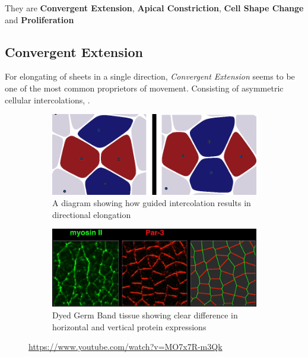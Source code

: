 They are \textbf{Convergent Extension}, \textbf{Apical Constriction}, \textbf{Cell Shape Change} and \textbf{Proliferation}

\subsection{Convergent Extension}
\label{sec:ConvergentExtension}
For elongating of sheets in a single direction, \textit{Convergent Extension} seems to be one of the most common proprietors of movement. Consisting of asymmetric cellular intercolations, .



\begin{figure}[H]
    \centering
    \begin{subfigure}{0.45\linewidth}
        \centering
    \includegraphics[width=\linewidth]{chapters/Theory/figures/ConvergentExtensionDiagram.png}
    \caption{A diagram showing how guided intercolation results in directional elongation}
    \end{subfigure}
        \begin{subfigure}{0.45\linewidth}
        \centering
        \caption{Dyed Germ Band tissue showing clear difference in horizontal and vertical protein expressions}
    \includegraphics[width=\linewidth]{chapters/Theory/figures/bipolar-PCP.png}
    \end{subfigure}
    \caption{\cite{zallen2004patterned}\url{https://www.youtube.com/watch?v=MO7x7R-m3Qk}}
    
    \label{fig:ConvergentExtensionDiagram}
\end{figure}

